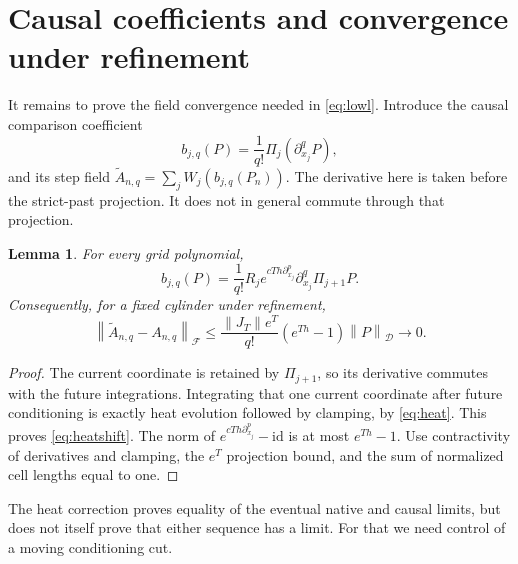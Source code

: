 \documentclass[11pt]{article}
\newtheorem{lemma}[theorem]{Lemma}
\theoremstyle{remark}\newtheorem{remark}[theorem]{Remark}
\newcommand{\D}{\mathcal D}\newcommand{\E}{\mathcal E}
\newcommand{\norm}[1]{\left\lVert#1\right\rVert}
\begin{document}
\section{Causal coefficients and convergence under refinement}
It remains to prove the field convergence needed in
\eqref{eq:lowl}. Introduce the causal comparison coefficient
\begin{equation}\label{eq:causaljet}
 b_{j,q}(P)=\frac1{q!}\Pi_j(\partial_{x_j}^qP),
\end{equation}
and its step field $\widetilde A_{n,q}=\sum_j W_j(b_{j,q}(P_n))$.
The derivative here is taken before the strict-past projection.
It does not in general commute through that projection.

\begin{lemma}\label{lem:heatshift}
For every grid polynomial,
\begin{equation}\label{eq:heatshift}
 b_{j,q}(P)=\frac1{q!}R_j
 e^{cTh\partial_{x_j}^p}\partial_{x_j}^q\Pi_{j+1}P.
\end{equation}
Consequently, for a fixed cylinder under refinement,
\begin{equation}\label{eq:heaterror}
 \norm{\widetilde A_{n,q}-A_{n,q}}_{\mathcal F}
 \leq\frac{\norm{J_T}e^T}{q!}(e^{Th}-1)\norm P_{\D}
 \longrightarrow0.
\end{equation}
\end{lemma}
\begin{proof}
The current coordinate is retained by $\Pi_{j+1}$, so its derivative
commutes with the future integrations. Integrating that one current
coordinate after future conditioning is exactly heat evolution
followed by clamping, by \eqref{eq:heat}. This proves
\eqref{eq:heatshift}. The norm of
$e^{cTh\partial_{x_j}^p}-\mathrm{id}$ is at most $e^{Th}-1$.
Use contractivity of derivatives and clamping, the $e^T$ projection
bound, and the sum of normalized cell lengths equal to one.
\end{proof}

The heat correction proves equality of the eventual native and
causal limits, but does not itself prove that either sequence has
a limit. For that we need control of a moving conditioning cut.
\end{document}
